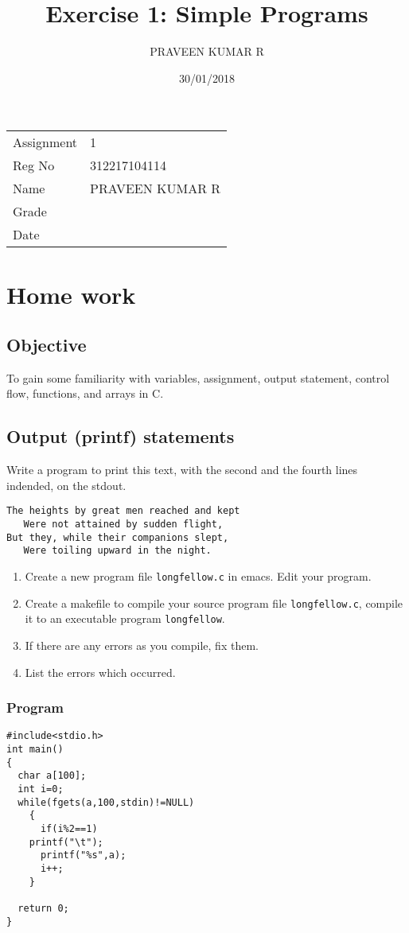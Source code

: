 \documentclass[11pt]{article}
\author{PRAVEEN KUMAR R}
\date{30/01/2018}
\title{Exercise 1: Simple Programs}
\begin{document}
\maketitle
\begin{center}
\begin{tabular}{ll}
Assignment & 1\\
Reg No & 312217104114\\
Name & PRAVEEN KUMAR R\\
Grade & \\
Date & \\
\end{tabular}
\end{center}

\section{Home work}
\label{sec-1}

\subsection*{Objective}
\label{sec-1-1}
To gain some familiarity with variables, assignment, output
statement, control flow, functions, and arrays in C.

\subsection*{Output (printf) statements}
\label{sec-1-2}
Write a program to print this text, with the second and the fourth
lines indended, on the stdout.
\begin{verbatim}
The heights by great men reached and kept
   Were not attained by sudden flight,
But they, while their companions slept,
   Were toiling upward in the night.
\end{verbatim}

\begin{enumerate}
\item Create a new program file \texttt{longfellow.c} in emacs. Edit your
program.
\item Create a makefile to compile your source program file
\texttt{longfellow.c}, compile it to an executable program
\texttt{longfellow}.
\item If there are any errors as you compile, fix them.
\item List the errors which occurred.
\end{enumerate}
\subsubsection*{Program}
\label{sec-1-2-1}
\begin{verbatim}
#include<stdio.h>
int main()
{
  char a[100];
  int i=0;
  while(fgets(a,100,stdin)!=NULL)
    {
      if(i%2==1)
	printf("\t");
      printf("%s",a);
      i++;
    }

  return 0;
}
\end{verbatim}
\end{document}
